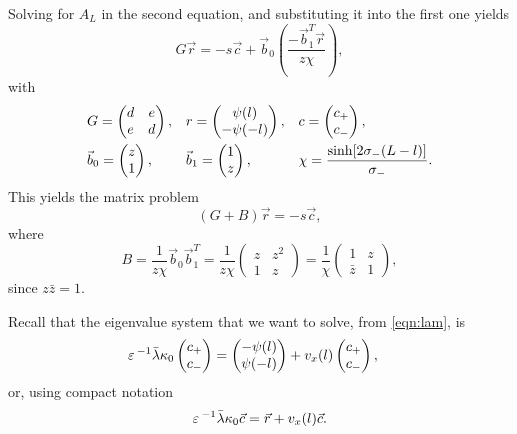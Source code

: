 Solving for $A_L$ in the second equation, and substituting it into the first one yields
% 
\begin{equation*}
  G\vec{r} = -s\vec{c} + \vec{b}_0\left(\frac{-\vec{b}_1^T\vec{r}}{z\chi}\right),
\end{equation*}
% 
with 
% 
\begin{equation*}
	\begin{split}
	\begin{aligned}
	&G = \begin{pmatrix} d&e\\e&d\end{pmatrix},
	&&r = \begin{pmatrix} \psi(l)\\ -\psi(-l)\end{pmatrix},
	&&c = \begin{pmatrix} c_+\\ c_-\end{pmatrix},\\
	&\vec{b}_0 = \begin{pmatrix} z\\ 1\end{pmatrix},
	&&\vec{b}_1 = \begin{pmatrix} 1\\ z\end{pmatrix},
	&&\chi = \frac{\sinh[2\sigma_-(L-l)]}{\sigma_-}.
	\end{aligned}
	\end{split}
\end{equation*}
% 
This yields the matrix problem
% 
\begin{equation}
\label{eqn:reqn1}
  (G+B)\vec{r} = -s\vec{c},
\end{equation}
% 
where 
% 
\[
  B = \frac{1}{z\chi}\vec{b}_0\vec{b}_1^T = \frac{1}{z\chi}\begin{pmatrix} z&z^2\\1& z\end{pmatrix} =
  \frac{1}{\chi}\begin{pmatrix} 1&z\\ \bar{z}& 1\end{pmatrix},
\]
% 
since $z\bar{z}=1$.

Recall that the eigenvalue system that we want to solve, from \eqref{eqn:lam}, is
% 
\begin{equation*}
	\begin{split}
	\varepsilon\,^{-1}\bar{\lambda}\kappa_0\begin{pmatrix}c_+\\c_-\end{pmatrix}
   &=
	\begin{pmatrix} -\psi(l) \\ \psi(-l) \end{pmatrix}
	 +v_x(l) \begin{pmatrix}c_+\\c_-\end{pmatrix},
	\end{split}
\end{equation*}
%
or, using compact notation
% 
\begin{equation}
\label{eqn:reqn2}
 \varepsilon\,^{-1}\bar{\lambda}\kappa_0\vec{c} = \vec{r} + v_x(l)\vec{c}.
\end{equation}
% 

